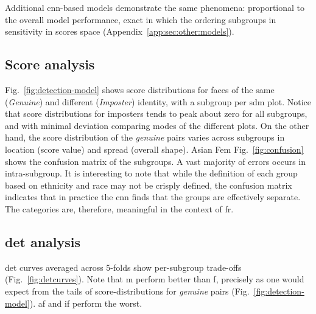 Additional \gls{cnn}-based models demonstrate the same phenomena: proportional to the overall model performance, exact in which the ordering subgroups in sensitivity in scores space (Appendix~\ref{app:sec:other:models}).




\subsection{Score analysis}
Fig.~\ref{fig:detection-model} shows score distributions for faces of the same (\ie \emph{Genuine}) and different (\ie \emph{Imposter}) identity, with a subgroup per \gls{sdm} plot. Notice that score distributions for imposters tends to peak about zero for all subgroups, and with minimal deviation comparing modes of the different plots. On the other hand, the score distribution of the \emph{genuine} pairs varies across subgroups in location (\ie score value) and spread (\ie overall shape). Asian Fem
Fig.~\ref{fig:confusion} shows the confusion matrix of the subgroups. A vast majority of errors occurs in intra-subgroup. It is interesting to note that while the definition of  each group  based on ethnicity and race may not be crisply defined, the confusion matrix indicates that in practice the \gls{cnn} finds that the groups are effectively separate. The categories are, therefore, meaningful in the context of \gls{fr}.


\subsection{\gls{det} analysis}

\gls{det} curves averaged across 5-folds show per-subgroup trade-offs (Fig.~\ref{fig:detcurves}). Note that \gls{m} perform better than \gls{f}, precisely as one would expect from the tails of score-distributions for \emph{genuine} pairs (Fig.~\ref{fig:detection-model}). \Gls{af} and \gls{if} perform the worst.


